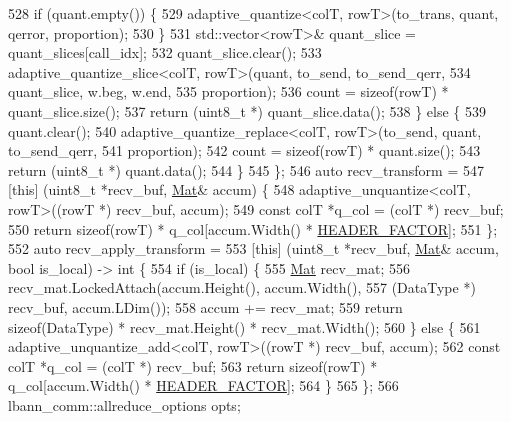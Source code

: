\begin{DoxyCode}
528       \textcolor{keywordflow}{if} (quant.empty()) \{
529         adaptive\_quantize<colT, rowT>(to\_trans, quant, qerror, proportion);
530       \}
531       std::vector<rowT>& quant\_slice = quant\_slices[call\_idx];
532       quant\_slice.clear();
533       adaptive\_quantize\_slice<colT, rowT>(quant, to\_send, to\_send\_qerr,
534                                           quant\_slice, w.beg, w.end,
535                                           proportion);
536       count = \textcolor{keyword}{sizeof}(rowT) * quant\_slice.size();
537       \textcolor{keywordflow}{return} (uint8\_t *) quant\_slice.data();
538     \} \textcolor{keywordflow}{else} \{
539       quant.clear();
540       adaptive\_quantize\_replace<colT, rowT>(to\_send, quant, to\_send\_qerr,
541                                             proportion);
542       count = \textcolor{keyword}{sizeof}(rowT) * quant.size();
543       \textcolor{keywordflow}{return} (uint8\_t *) quant.data();
544     \}
545   \};
546   \textcolor{keyword}{auto} recv\_transform =
547   [\textcolor{keyword}{this}] (uint8\_t *recv\_buf, \hyperlink{base_8hpp_a68f11fdc31b62516cb310831bbe54d73}{Mat}& accum) \{
548     adaptive\_unquantize<colT, rowT>((rowT *) recv\_buf, accum);
549     \textcolor{keyword}{const} colT *q\_col = (colT *) recv\_buf;
550     \textcolor{keywordflow}{return} \textcolor{keyword}{sizeof}(rowT) * q\_col[accum.Width() * \hyperlink{classlbann_1_1lbann__quantizer_afb4315625e371169cabfac56c3f75d37}{HEADER\_FACTOR}];
551   \};
552   \textcolor{keyword}{auto} recv\_apply\_transform =
553   [\textcolor{keyword}{this}] (uint8\_t *recv\_buf, \hyperlink{base_8hpp_a68f11fdc31b62516cb310831bbe54d73}{Mat}& accum, \textcolor{keywordtype}{bool} is\_local) -> \textcolor{keywordtype}{int} \{
554     \textcolor{keywordflow}{if} (is\_local) \{
555       \hyperlink{base_8hpp_a68f11fdc31b62516cb310831bbe54d73}{Mat} recv\_mat;
556       recv\_mat.LockedAttach(accum.Height(), accum.Width(),
557                             (DataType *) recv\_buf, accum.LDim());
558       accum += recv\_mat;
559       \textcolor{keywordflow}{return} \textcolor{keyword}{sizeof}(DataType) * recv\_mat.Height() * recv\_mat.Width();
560     \} \textcolor{keywordflow}{else} \{
561       adaptive\_unquantize\_add<colT, rowT>((rowT *) recv\_buf, accum);
562       \textcolor{keyword}{const} colT *q\_col = (colT *) recv\_buf;
563       \textcolor{keywordflow}{return} \textcolor{keyword}{sizeof}(rowT) * q\_col[accum.Width() * \hyperlink{classlbann_1_1lbann__quantizer_afb4315625e371169cabfac56c3f75d37}{HEADER\_FACTOR}];
564     \}
565   \};
566   lbann\_comm::allreduce\_options opts;

\end{DoxyCode}
